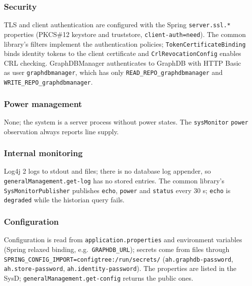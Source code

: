 \documentclass[a4paper]{arrowhead}
\begin{document}
\subsubsection{Security}

TLS and client authentication are configured with the Spring \texttt{server.\allowbreak{}ssl.\allowbreak{}*} properties (PKCS\#12 keystore and truststore, \texttt{client-\allowbreak{}auth=\allowbreak{}need}). The common library's filters implement the authentication policies; \texttt{Token\allowbreak{}Certificate\allowbreak{}Binding} binds identity tokens to the client certificate and \texttt{Crl\allowbreak{}Revocation\allowbreak{}Config} enables CRL checking. GraphDBManager authenticates to GraphDB with HTTP Basic as user \texttt{graphdbmanager}, which has only \texttt{READ\_\allowbreak{}REPO\_\allowbreak{}graphdbmanager} and \texttt{WRITE\_\allowbreak{}REPO\_\allowbreak{}graphdbmanager}.

\subsubsection{Power management}

None; the system is a server process without power states. The \texttt{sysMonitor} \texttt{power} observation always reports line supply.

\subsubsection{Internal monitoring}

Log4j 2 logs to stdout and files; there is no database log appender, so \texttt{general\allowbreak{}Management.\allowbreak{}get-\allowbreak{}log} has no stored entries. The common library's \texttt{Sys\allowbreak{}Monitor\allowbreak{}Publisher} publishes \texttt{echo}, \texttt{power} and \texttt{status} every 30 s; \texttt{echo} is \texttt{degraded} while the historian query fails.

\subsubsection{Configuration}

Configuration is read from \texttt{application.\allowbreak{}properties} and environment variables (Spring relaxed binding, e.g.\ \texttt{GRAPHDB\_\allowbreak{}URL}); secrets come from files through \texttt{SPRING\_\allowbreak{}CONFIG\_\allowbreak{}IMPORT=\allowbreak{}configtree:\allowbreak{}/\allowbreak{}run/\allowbreak{}secrets/\allowbreak{}} (\texttt{ah.\allowbreak{}graphdb-\allowbreak{}password}, \texttt{ah.\allowbreak{}store-\allowbreak{}password}, \texttt{ah.\allowbreak{}identity-\allowbreak{}password}). The properties are listed in the SysD; \texttt{general\allowbreak{}Management.\allowbreak{}get-\allowbreak{}config} returns the public ones.
\end{document}
